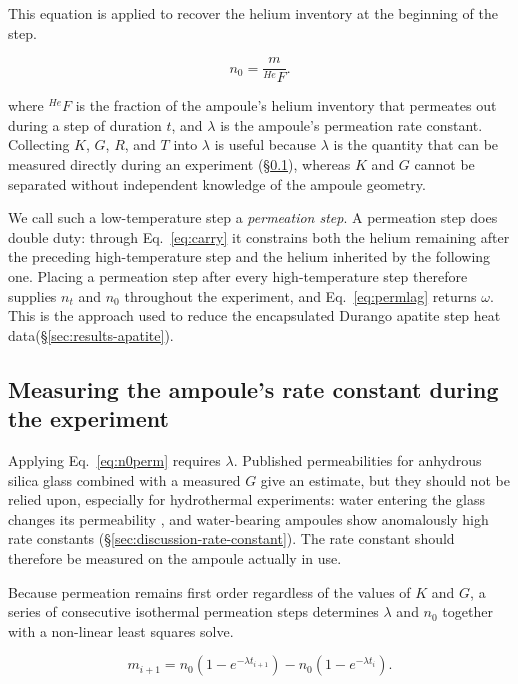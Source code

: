 This equation is applied to recover the helium inventory at the beginning of the step.

\begin{equation}
\label{eq:n0perm}
n_{0} = \frac{m}{^{He}F} .
\end{equation}

where $^{He}F$ is the fraction of the ampoule's helium inventory that permeates out during a step of duration $t$, and $\lambda$ is the ampoule's permeation rate constant. Collecting $K$, $G$, $R$, and $T$ into $\lambda$ is useful because $\lambda$ is the quantity that can be measured directly during an experiment (\S\ref{sec:rate-constant}), whereas $K$ and $G$ cannot be separated without independent knowledge of the ampoule geometry.
 
We call such a low-temperature step a \emph{permeation step}. A permeation step does double duty: through Eq.~\eqref{eq:carry} it constrains both the helium remaining after the preceding high-temperature step and the helium inherited by the following one. Placing a permeation step after every high-temperature step therefore supplies $n_{t}$ and $n_{0}$ throughout the experiment, and Eq.~\eqref{eq:permlag} returns $\omega$. This is the approach used to reduce the encapsulated Durango apatite step heat data(\S\ref{sec:results-apatite}).

\subsection{Measuring the ampoule's rate constant during the experiment}\label{sec:rate-constant}

Applying Eq.~\eqref{eq:n0perm} requires $\lambda$. Published permeabilities for anhydrous silica glass \citep{norton1953,altemose1961,swets1961,masaryk1968} combined with a measured $G$ give an estimate, but they should not be relied upon, especially for hydrothermal experiments: water entering the glass changes its permeability \citep{shelby1972,tsuru2011}, and water-bearing ampoules show anomalously high rate constants (\S\ref{sec:discussion-rate-constant}). The rate constant should therefore be measured on the ampoule actually in use.

Because permeation remains first order regardless of the values of $K$ and $G$, a series of consecutive isothermal permeation steps determines $\lambda$ and $n_{0}$ together with a non-linear least squares solve.

\begin{equation}
\label{eq:incyield}
m_{i+1} = n_{0}\left(1 - e^{-\lambda t_{i+1}}\right) - n_{0}\left(1 - e^{-\lambda t_{i}}\right) .
\end{equation}

